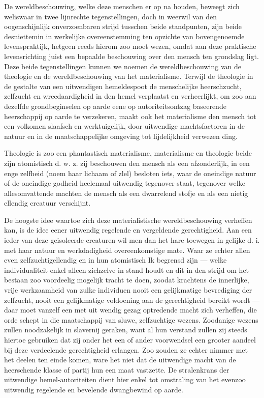 \documentclass[a4paper, 12pt, oneside, dutch]{article}
\begin{document}
De wereldbeschouwing, welke deze menschen er op na houden, beweegt zich weliswaar in twee lijnrechte tegenstellingen, doch in weerwil van den oogenschijnlijk onverzoenbaren strijd tusschen beide standpunten, zijn beide desniettemin in werkelijke overeenstemming ten opzichte van bovengenoemde levenspraktijk, hetgeen reeds hierom zoo moet wezen, omdat aan deze praktische levensrichting juist een bepaalde beschouwing over den mensch ten grondslag ligt. Deze beide tegenstellingen kunnen we noemen de wereldbeschouwing van de theologie en de wereldbeschouwing van het materialisme. Terwijl de theologie in de gestalte van een uitwendigen hemeldespoot de menschelijke heerschzucht, zelfzucht en wreedaardigheid in den hemel verplaatst en verheerlijkt, om zoo aan dezelfde grondbeginselen op aarde eene op autoriteitsontzag baseerende heerschappij op aarde te verzekeren, maakt ook het materialisme den mensch tot een volkomen slaafsch en werktuigelijk, door uitwendige machtsfactoren in de natuur en in de maatschappelijke omgeving tot lijdelijkheid verwezen ding.

Theologie is zoo een phantastisch materialisme, materialisme en theologie beide zijn atomistisch d. w. z. zij beschouwen den mensch als een afzonderlijk, in een enge zelfheid (noem haar lichaam of zlel) besloten iets, waar de oneindige natuur of de oneindige godheid heelemaal uitwendig tegenover staat, tegenover welke allesomvattende machten de mensch als een dwarrelend stofje en als een nietig ellendig creatuur verschijnt.

De hoogste idee waartoe zich deze materialistische wereldbeschouwing verheffen kan, is de idee eener uitwendig regelende en vergeldende gerechtigheid. Aan een ieder van deze geisoleerde creaturen wil men dan het hare toewegen in gelijke d. i. met haar natuur en werkdadigheid overeenkomstige mate. Waar ze echter allen even zelfzuchtigellendig en in hun atomistisch Ik begrensd zijn --- welke individualiteit enkel alleen zichzelve in stand houdt en dit in den strijd om het bestaan zoo voordeelig mogelijk tracht te doen, zoodat krachtens de innerlijke, vrije werkzaamheid van zulke individuen nooit een gelijkmatige bevrediging der zelfzucht, nooit een gelijkmatige voldoening aan de gerechtigheid bereikt wordt --- daar moet vanzelf een met uit wendig gezag optredende macht zich verheffen, die orde schept in die maatschappij van sluwe, zelfzuchtige wezens. Zoodanige wezens zullen noodzakelijk in slavernij geraken, want al hun verstand zullen zij steeds hiertoe gebruiken dat zij onder het een of ander voorwendsel een grooter aandeel bij deze verdeelende gerechtigheid erlangen. Zoo zouden ze echter nimmer met het deelen ten einde komen, ware het niet dat de uitwendige macht van de heerschende klasse of partij hun een maat vastzette. De stralenkrans der uitwendige hemel-autoriteiten dient hier enkel tot omstraling van het evenzoo uitwendig regelende en bevelende dwangbewind op aarde.
\end{document}
